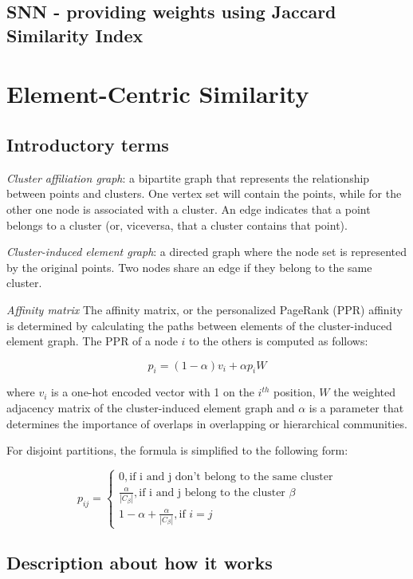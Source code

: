     \subsection{SNN - providing weights using Jaccard Similarity Index}
    

\section{Element-Centric Similarity}
    \subsection{Introductory terms}
    \textit{Cluster affiliation graph}: a bipartite graph that represents the relationship between points and clusters. One vertex set will contain the points, while for the other one node is associated with a cluster. An edge indicates that a point belongs to a cluster (or, viceversa, that a cluster contains that point).
    
    \textit{Cluster-induced element graph}: a directed graph where the node set is represented by the original points. Two nodes share an edge if they belong to the same cluster.

    \textit{Affinity matrix} The affinity matrix, or the personalized PageRank (PPR) affinity is determined by calculating the paths between elements of the cluster-induced element graph. The PPR of a node $i$ to the others is computed as follows:

    \[ p_i = (1 - \alpha) v_i + \alpha p_i W \]

    where $v_i$ is a one-hot encoded vector with 1 on the $i^{th}$ position, $W$ the weighted adjacency matrix of the cluster-induced element graph and $\alpha$ is a parameter that determines the importance of overlaps in overlapping or hierarchical communities.

    For disjoint partitions, the formula is simplified to the following form:

    \[ 
        p_{ij} = 
        \begin{cases}
            0, \text{if i and j don't belong to the same cluster} \\
            \frac{\alpha}{|C_\beta|}, \text{if i and j belong to the cluster } \beta \\
            1 - \alpha + \frac{\alpha}{|C_\beta|}, \text{if } i = j
        \end{cases}
    \]
    
    \subsection{Description about how it works}

